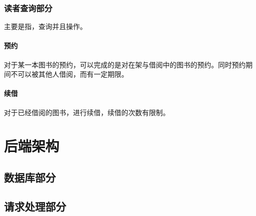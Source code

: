 \documentclass[UTF8]{report}
\begin{document}
    \section{读者查询部分}
    主要是指，查询并且操作。
    \subsection{预约}
    对于某一本图书的预约，可以完成的是对在架与借阅中的图书的预约。同时预约期间不可以被其他人借阅，而有一定期限。
    \subsection{续借}
    对于已经借阅的图书，进行续借，续借的次数有限制。
    \part{后端架构}
    \setcounter{chapter}{0}
    \chapter{数据库部分}
    \chapter{请求处理部分}
\end{document}
